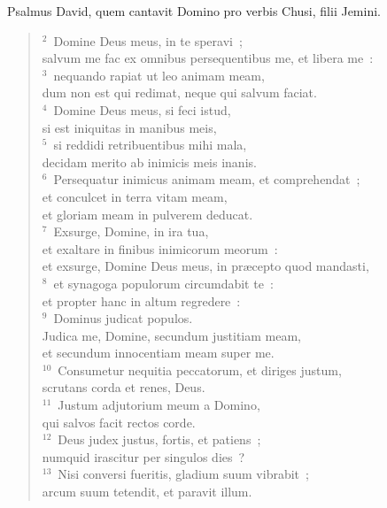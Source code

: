 \lettrine[lines=3,image=true,loversize=0.05,lraise=-0.03]{P}{}salmus David, quem cantavit Domino pro verbis Chusi, filii Jemini.
\begin{flushleft}\begin{verse}\vspace{6pt}${}^{2}$~Domine Deus meus, in te speravi~;\\ salvum me fac ex omnibus persequentibus me, et libera me~:\\
${}^{3}$~nequando rapiat ut leo animam meam,\\ dum non est qui redimat, neque qui salvum faciat.\\
${}^{4}$~Domine Deus meus, si feci istud,\\ si est iniquitas in manibus meis,\\
${}^{5}$~si reddidi retribuentibus mihi mala,\\ decidam merito ab inimicis meis inanis.\\
${}^{6}$~Persequatur inimicus animam meam, et comprehendat~;\\ et conculcet in terra vitam meam,\\ et gloriam meam in pulverem deducat.\\
${}^{7}$~Exsurge, Domine, in ira tua,\\ et exaltare in finibus inimicorum meorum~:\\ et exsurge, Domine Deus meus, in pr\ae cepto quod mandasti,\\
${}^{8}$~et synagoga populorum circumdabit te~:\\ et propter hanc in altum regredere~:\\
${}^{9}$~Dominus judicat populos.\\ Judica me, Domine, secundum justitiam meam,\\ et secundum innocentiam meam super me.\\
${}^{10}$~Consumetur nequitia peccatorum, et diriges justum,\\ scrutans corda et renes, Deus.\\
${}^{11}$~Justum adjutorium meum a Domino,\\ qui salvos facit rectos corde.\\
${}^{12}$~Deus judex justus, fortis, et patiens~;\\ numquid irascitur per singulos dies~?\\
${}^{13}$~Nisi conversi fueritis, gladium suum vibrabit~;\\ arcum suum tetendit, et paravit illum.\\

\end{verse}
\end{flushleft}
